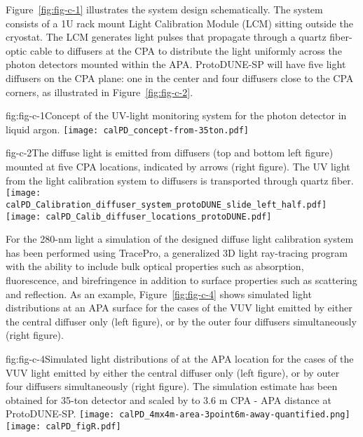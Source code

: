 Figure~\ref{fig:fig-c-1} illustrates the system design schematically. The system consists of a 1U rack mount Light Calibration Module (LCM) sitting outside the cryostat. The LCM generates light pulses that propagate through a quartz fiber-optic cable to diffusers at the CPA to distribute the light uniformly across the photon detectors mounted within the APA.  ProtoDUNE-SP will have five light 
diffusers on the CPA plane: one in the center and four diffusers close to the CPA corners, as illustrated in Figure~\ref{fig:fig-c-2}. 
%
 \begin{cdrfigure}{fig:fig-c-1}{Concept of the UV-light monitoring system for the photon detector in liquid argon.}
\texttt{[image: calPD\_concept-from-35ton.pdf]}
\end{cdrfigure}
%
%
\begin{cdrfigure}{fig-c-2}{The diffuse light is emitted from diffusers (top and bottom left figure) mounted at five CPA locations, indicated by arrows (right figure). 
The UV light from the light calibration system to diffusers is transported through quartz fiber.}
\texttt{[image: calPD\_Calibration\_diffuser\_system\_protoDUNE\_slide\_left\_half.pdf]}
\texttt{[image: calPD\_Calib\_diffuser\_locations\_protoDUNE.pdf]}
\end{cdrfigure}

%
%
For the 280-nm light  a simulation of the designed diffuse light calibration system has been performed using TracePro, a generalized 3D light ray-tracing program with the ability 
to include bulk optical properties such as absorption, fluorescence, and birefringence in addition to surface properties such as scattering and reflection. 
As an example, Figure~\ref{fig:fig-c-4} shows simulated light distributions at an APA surface for the cases of the VUV light emitted by either the central diffuser only (left figure), 
or by the outer four diffusers simultaneously (right figure). 

%
 \begin{cdrfigure}{fig:fig-c-4}{Simulated light distributions of at the APA location for the cases of the VUV light emitted by either the central diffuser only (left figure), or by outer four diffusers simultaneously (right figure).
The simulation estimate has been obtained for 35-ton detector and scaled by to 3.6 m CPA - APA distance at ProtoDUNE-SP.}
\texttt{[image: calPD\_4mx4m-area-3point6m-away-quantified.png]}
\texttt{[image: calPD\_figR.pdf]}
\end{cdrfigure}
%

